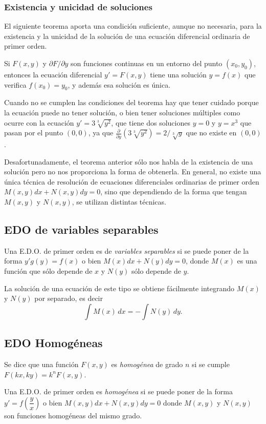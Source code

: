 \subsubsection*{Existencia y unicidad de soluciones}
El siguiente teorema aporta una condición suficiente, aunque no necesaria, para la existencia y la unicidad de la
solución de una ecuación diferencial ordinaria de primer orden.

\begin{teoremasn}
Si $F(x,y)$ y $\partial F/\partial y$ son funciones continuas en un entorno del punto $(x_0,y_0)$, entonces la ecuación
diferencial $y'=F(x,y)$ tiene una solución $y=f(x)$ que verifica $f(x_0)=y_0$, y además esa solución es única.
\end{teoremasn}
Cuando no se cumplen las condiciones del teorema hay que tener cuidado porque la ecuación puede no tener solución, o
bien tener soluciones múltiples como ocurre con la ecuación $y'=3\sqrt[3]{y^2}$, que tiene dos soluciones $y=0$ y
$y=x^3$ que pasan por el punto $(0,0)$, ya que $\frac{\partial}{\partial y}(3\sqrt[3]{y^2})=2/\sqrt[3]{y}$ que no existe
en $(0,0)$.

Desafortunadamente, el teorema anterior sólo nos habla de la existencia de una solución pero no nos proporciona la forma
de obtenerla. 
En general, no existe una única técnica de resolución de ecuaciones diferenciales ordinarias de primer orden
$M(x,y)dx+N(x,y)dy=0$, sino que dependiendo de la forma que tengan $M(x,y)$ y $N(x,y)$, se utilizan distintas técnicas.


\subsection{EDO de variables separables}
Una E.D.O. de primer orden es de \emph{variables separables} si se puede poner de la forma $y'g(y)=f(x)$ o bien
$M(x)dx+N(y)dy=0$, donde $M(x)$ es una función que sólo depende de $x$ y $N(y)$ sólo depende de $y$.

La solución de una ecuación de este tipo se obtiene fácilmente integrando $M(x)$ y $N(y)$ por separado, es decir
\[
\int M(x)\,dx=-\int N(y)\,dy.
\]

\subsection{EDO Homogéneas}
Se dice que una función $F(x,y)$ es \emph{homogénea} de grado $n$ si se cumple $F(kx,ky)=k^nF(x,y)$.

Una E.D.O. de primer orden es \emph{homogénea} si se puede poner de la forma
$y'=f\left(\dfrac{y}{x}\right)$ o bien $M(x,y)dx+N(x,y)dy=0$ donde $M(x,y)$ y $N(x,y)$ son funciones homogéneas del mismo grado.

